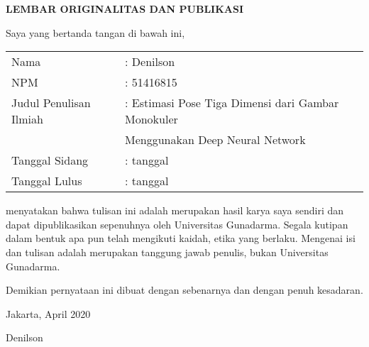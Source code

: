 
\newpage
{}
\begin{center}
    {\large \bf \centering LEMBAR ORIGINALITAS DAN PUBLIKASI}
    \vspace{0.75cm}
\end{center}

\noindent Saya yang bertanda tangan di bawah ini,
\vspace{0.5cm}

\begin{flushleft}
    \begin{tabular}{ll}
        Nama                   & : Denilson                                         \\
        NPM                    & : 51416815                                         \\
        Judul Penulisan Ilmiah & : Estimasi Pose Tiga Dimensi dari Gambar Monokuler \\
                               & \hspace{5pt} Menggunakan Deep Neural Network       \\
        Tanggal Sidang         & : tanggal                                          \\
        Tanggal Lulus          & : tanggal                                          \\
    \end{tabular}
\end{flushleft}

\vspace{0.5cm}

\noindent menyatakan bahwa tulisan ini adalah merupakan hasil karya saya sendiri dan dapat
dipublikasikan sepenuhnya oleh Universitas Gunadarma. Segala kutipan dalam bentuk apa pun telah
mengikuti kaidah, etika yang berlaku. Mengenai isi dan tulisan adalah merupakan tanggung jawab
penulis, bukan Universitas Gunadarma.

\vspace{0.5cm}

\noindent Demikian pernyataan ini dibuat dengan sebenarnya dan dengan penuh kesadaran.

\begin{flushright}
    Jakarta, April 2020

    \vspace{2cm}

    Denilson
\end{flushright}